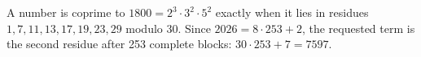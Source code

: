 A number is coprime to $1800=2^3\cdot3^2\cdot5^2$ exactly when it lies in residues $1,7,11,13,17,19,23,29$ modulo 30. Since $2026=8\cdot253+2$, the requested term is the second residue after 253 complete blocks: $30\cdot253+7=\boxed{7597}$.
